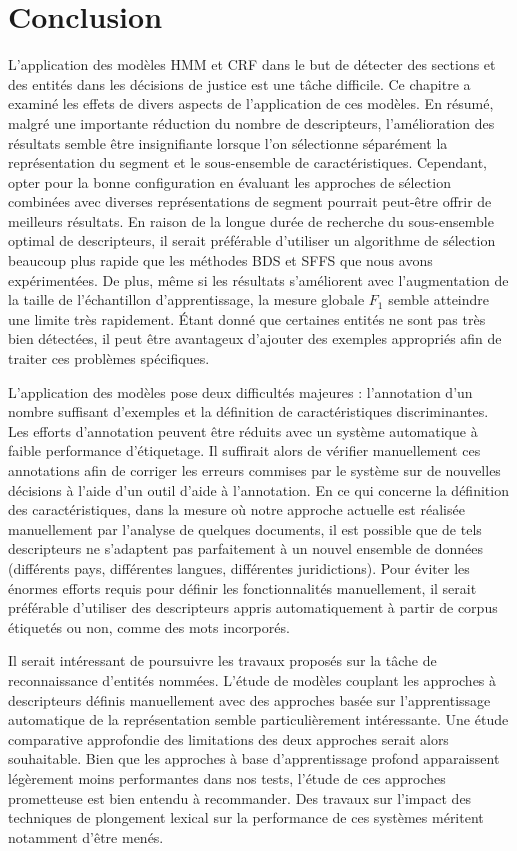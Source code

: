 \section{Conclusion}
\label{sec:structuration:conclusion}
L'application des modèles HMM et CRF dans le but de détecter des sections et des entités dans les décisions de justice est une tâche difficile. Ce chapitre a examiné les effets de divers aspects de l'application de ces modèles. En résumé, malgré une importante réduction du nombre de descripteurs, l'amélioration des résultats semble être insignifiante lorsque l'on sélectionne séparément la représentation du segment et le sous-ensemble de caractéristiques. Cependant, opter pour la bonne configuration en évaluant les approches de sélection combinées avec diverses représentations de segment pourrait peut-être offrir de meilleurs résultats. En raison de la longue durée de recherche du sous-ensemble optimal de descripteurs, il serait préférable d'utiliser un algorithme de sélection beaucoup plus rapide que les méthodes BDS et SFFS que nous avons expérimentées. De plus, même si les résultats s'améliorent avec l'augmentation de la taille de l'échantillon d'apprentissage, la mesure globale $F_1$ semble atteindre une limite très rapidement. Étant donné que certaines entités ne sont pas très bien détectées, il peut être avantageux d'ajouter des exemples appropriés afin de traiter ces problèmes spécifiques.

L'application des modèles pose deux difficultés majeures : l'annotation d'un nombre suffisant d'exemples et la définition de caractéristiques discriminantes. Les efforts d'annotation peuvent être réduits avec un système automatique à faible performance d'étiquetage. Il suffirait alors de vérifier manuellement ces annotations afin de corriger les erreurs commises par le système sur de nouvelles décisions à l'aide d'un outil d'aide à l'annotation. En ce qui concerne la définition des caractéristiques, dans la mesure où notre approche actuelle est réalisée manuellement par l'analyse de quelques documents, il est possible que de tels descripteurs ne s'adaptent pas parfaitement à un nouvel ensemble de données (différents pays, différentes langues, différentes juridictions). Pour éviter les énormes efforts requis pour définir les fonctionnalités manuellement, il serait préférable d'utiliser des descripteurs appris automatiquement à partir de corpus étiquetés ou non, comme des mots incorporés.

Il serait intéressant de poursuivre les travaux proposés sur la tâche de reconnaissance d'entités nommées. L'étude de modèles couplant les approches à descripteurs définis manuellement avec des approches basée sur l'apprentissage automatique de la représentation semble particulièrement intéressante. Une étude comparative approfondie des limitations des deux approches serait alors souhaitable. Bien que les approches à base d'apprentissage profond apparaissent légèrement moins performantes dans nos tests, l'étude de ces approches prometteuse est bien entendu à recommander. Des travaux sur l'impact des techniques de plongement lexical sur la performance de ces systèmes méritent notamment d'être menés.

